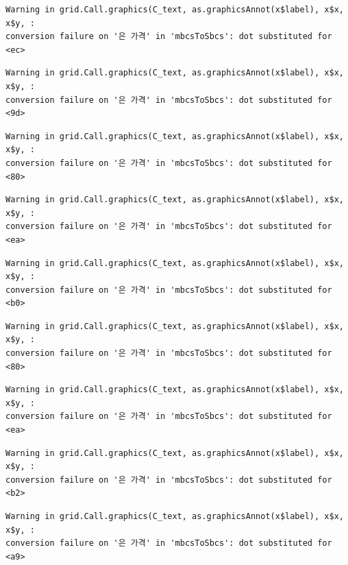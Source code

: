 \documentclass[
  letterpaper,
  DIV=11,
  numbers=noendperiod]{scrreprt}
\begin{document}
\begin{verbatim}
Warning in grid.Call.graphics(C_text, as.graphicsAnnot(x$label), x$x, x$y, :
conversion failure on '은 가격' in 'mbcsToSbcs': dot substituted for <ec>
\end{verbatim}

\begin{verbatim}
Warning in grid.Call.graphics(C_text, as.graphicsAnnot(x$label), x$x, x$y, :
conversion failure on '은 가격' in 'mbcsToSbcs': dot substituted for <9d>
\end{verbatim}

\begin{verbatim}
Warning in grid.Call.graphics(C_text, as.graphicsAnnot(x$label), x$x, x$y, :
conversion failure on '은 가격' in 'mbcsToSbcs': dot substituted for <80>
\end{verbatim}

\begin{verbatim}
Warning in grid.Call.graphics(C_text, as.graphicsAnnot(x$label), x$x, x$y, :
conversion failure on '은 가격' in 'mbcsToSbcs': dot substituted for <ea>
\end{verbatim}

\begin{verbatim}
Warning in grid.Call.graphics(C_text, as.graphicsAnnot(x$label), x$x, x$y, :
conversion failure on '은 가격' in 'mbcsToSbcs': dot substituted for <b0>
\end{verbatim}

\begin{verbatim}
Warning in grid.Call.graphics(C_text, as.graphicsAnnot(x$label), x$x, x$y, :
conversion failure on '은 가격' in 'mbcsToSbcs': dot substituted for <80>
\end{verbatim}

\begin{verbatim}
Warning in grid.Call.graphics(C_text, as.graphicsAnnot(x$label), x$x, x$y, :
conversion failure on '은 가격' in 'mbcsToSbcs': dot substituted for <ea>
\end{verbatim}

\begin{verbatim}
Warning in grid.Call.graphics(C_text, as.graphicsAnnot(x$label), x$x, x$y, :
conversion failure on '은 가격' in 'mbcsToSbcs': dot substituted for <b2>
\end{verbatim}

\begin{verbatim}
Warning in grid.Call.graphics(C_text, as.graphicsAnnot(x$label), x$x, x$y, :
conversion failure on '은 가격' in 'mbcsToSbcs': dot substituted for <a9>
\end{verbatim}
\end{document}
